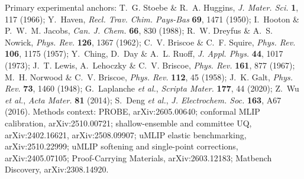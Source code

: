 \documentclass[11pt]{article}
\theoremstyle{definition}
\theoremstyle{remark}
\begin{document}
\sloppy
Primary experimental anchors: T.~G. Stoebe \& R.~A. Huggins, \emph{J. Mater. Sci.} \textbf{1}, 117 (1966); Y.~Haven, \emph{Recl. Trav. Chim. Pays-Bas} \textbf{69}, 1471 (1950); I.~Hooton \& P.~W.~M. Jacobs, \emph{Can. J. Chem.} \textbf{66}, 830 (1988); R.~W. Dreyfus \& A.~S. Nowick, \emph{Phys. Rev.} \textbf{126}, 1367 (1962); C.~V. Briscoe \& C.~F. Squire, \emph{Phys. Rev.} \textbf{106}, 1175 (1957); Y.~Ching, D.~Day \& A.~L. Ruoff, \emph{J. Appl. Phys.} \textbf{44}, 1017 (1973); J.~T. Lewis, A.~Lehoczky \& C.~V. Briscoe, \emph{Phys. Rev.} \textbf{161}, 877 (1967); M.~H. Norwood \& C.~V. Briscoe, \emph{Phys. Rev.} \textbf{112}, 45 (1958); J.~K. Galt, \emph{Phys. Rev.} \textbf{73}, 1460 (1948); G.~Laplanche \emph{et al.}, \emph{Scripta Mater.} \textbf{177}, 44 (2020); Z.~Wu \emph{et al.}, \emph{Acta Mater.} \textbf{81} (2014); S.~Deng \emph{et al.}, \emph{J. Electrochem. Soc.} \textbf{163}, A67 (2016). Methods context: PROBE, arXiv:2605.00640; conformal MLIP calibration, arXiv:2510.00721; shallow-ensemble and committee UQ, arXiv:2402.16621, arXiv:2508.09907; uMLIP elastic benchmarking, arXiv:2510.22999; uMLIP softening and single-point corrections, arXiv:2405.07105; Proof-Carrying Materials, arXiv:2603.12183; Matbench Discovery, arXiv:2308.14920.
\end{document}
